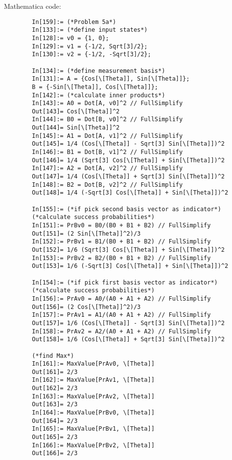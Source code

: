 \documentclass{article}
\theoremstyle{definition}
\begin{document}
\begin{enumerate}[label=(\alph*)]
	
	Mathematica code:
	\begin{lstlisting}
		In[159]:= (*Problem 5a*)
		In[133]:= (*define input states*)		
		In[128]:= v0 = {1, 0};		
		In[129]:= v1 = {-1/2, Sqrt[3]/2};		
		In[130]:= v2 = {-1/2, -Sqrt[3]/2};
		
		In[134]:= (*define measurement basis*)		
		In[131]:= A = {Cos[\[Theta]], Sin[\[Theta]]};
		B = {-Sin[\[Theta]], Cos[\[Theta]]};		
		In[142]:= (*calculate inner products*)		
		In[143]:= A0 = Dot[A, v0]^2 // FullSimplify		
		Out[143]= Cos[\[Theta]]^2		
		In[144]:= B0 = Dot[B, v0]^2 // FullSimplify		
		Out[144]= Sin[\[Theta]]^2		
		In[145]:= A1 = Dot[A, v1]^2 // FullSimplify		
		Out[145]= 1/4 (Cos[\[Theta]] - Sqrt[3] Sin[\[Theta]])^2		
		In[146]:= B1 = Dot[B, v1]^2 // FullSimplify		
		Out[146]= 1/4 (Sqrt[3] Cos[\[Theta]] + Sin[\[Theta]])^2		
		In[147]:= A2 = Dot[A, v2]^2 // FullSimplify		
		Out[147]= 1/4 (Cos[\[Theta]] + Sqrt[3] Sin[\[Theta]])^2		
		In[148]:= B2 = Dot[B, v2]^2 // FullSimplify		
		Out[148]= 1/4 (-Sqrt[3] Cos[\[Theta]] + Sin[\[Theta]])^2
		
		In[155]:= (*if pick second basis vector as indicator*)
		(*calculate success probabilities*)		
		In[151]:= PrBv0 = B0/(B0 + B1 + B2) // FullSimplify		
		Out[151]= (2 Sin[\[Theta]]^2)/3		
		In[152]:= PrBv1 = B1/(B0 + B1 + B2) // FullSimplify		
		Out[152]= 1/6 (Sqrt[3] Cos[\[Theta]] + Sin[\[Theta]])^2		
		In[153]:= PrBv2 = B2/(B0 + B1 + B2) // FullSimplify		
		Out[153]= 1/6 (-Sqrt[3] Cos[\[Theta]] + Sin[\[Theta]])^2
		
		In[154]:= (*if pick first basis vector as indicator*)
		(*calculate success probabilities*)		
		In[156]:= PrAv0 = A0/(A0 + A1 + A2) // FullSimplify		
		Out[156]= (2 Cos[\[Theta]]^2)/3		
		In[157]:= PrAv1 = A1/(A0 + A1 + A2) // FullSimplify		
		Out[157]= 1/6 (Cos[\[Theta]] - Sqrt[3] Sin[\[Theta]])^2		
		In[158]:= PrAv2 = A2/(A0 + A1 + A2) // FullSimplify		
		Out[158]= 1/6 (Cos[\[Theta]] + Sqrt[3] Sin[\[Theta]])^2
		
		(*find Max*)
		In[161]:= MaxValue[PrAv0, \[Theta]]		
		Out[161]= 2/3		
		In[162]:= MaxValue[PrAv1, \[Theta]]		
		Out[162]= 2/3		
		In[163]:= MaxValue[PrAv2, \[Theta]]		
		Out[163]= 2/3		
		In[164]:= MaxValue[PrBv0, \[Theta]]		
		Out[164]= 2/3		
		In[165]:= MaxValue[PrBv1, \[Theta]]		
		Out[165]= 2/3		
		In[166]:= MaxValue[PrBv2, \[Theta]]		
		Out[166]= 2/3
	\end{lstlisting}




\end{enumerate}
\end{document}

